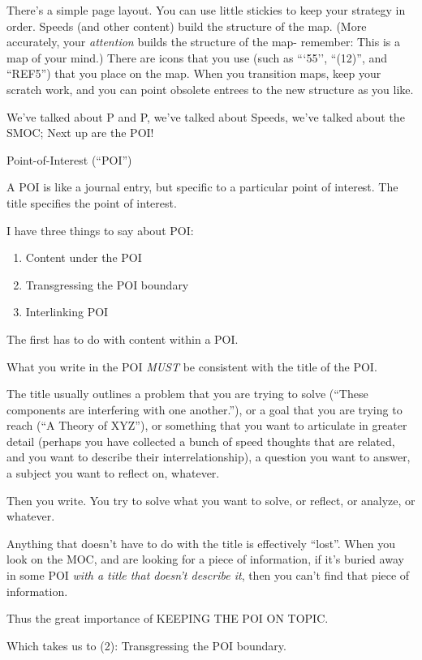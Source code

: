 \documentclass[oneside]{book}
\begin{document}
There's a simple page layout. You can use little stickies to keep your
strategy in order. Speeds (and other content) build the structure of
the map. (More accurately, your \emph{attention} builds the structure of
the map- remember: This is a map of your mind.) There are icons that
you use (such as ```55'', ``(12)'', and ``REF5'') that you place on the
map. When you transition maps, keep your scratch work, and you can
point obsolete entrees to the new structure as you like.

We've talked about P and P, we've talked about Speeds, we've talked about
the SMOC; Next up are the POI!

Point-of-Interest (``POI'')

A POI is like a journal entry, but specific to a particular point of
interest. The title specifies the point of interest.

I have three things to say about POI:

\begin{enumerate}
\item Content under the POI
\item Transgressing the POI boundary
\item Interlinking POI
\end{enumerate}

The first has to do with content within a POI.

What you write in the POI \emph{MUST} be consistent with the title of the
POI.

The title usually outlines a problem that you are trying to solve
(``These components are interfering with one another.''), or a goal that
you are trying to reach (``A Theory of XYZ''), or something that you
want to articulate in greater detail (perhaps you have collected a
bunch of speed thoughts that are related, and you want to describe
their interrelationship), a question you want to answer, a subject you
want to reflect on, whatever.

Then you write. You try to solve what you want to solve, or reflect,
or analyze, or whatever.

Anything that doesn't have to do with the title is effectively
``lost''. When you look on the MOC, and are looking for a piece of
information, if it's buried away in some POI \emph{with a title that
doesn't describe it}, then you can't find that piece of information.

Thus the great importance of KEEPING THE POI ON TOPIC.

Which takes us to (2): Transgressing the POI boundary.
\end{document}
